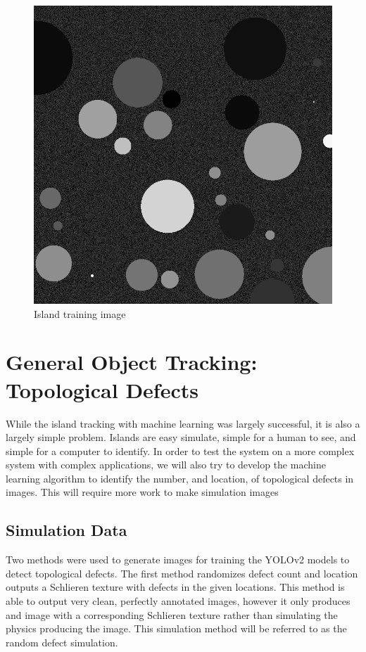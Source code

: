 \documentclass[prl,reprint,showpacs,floatfix,nofootinbib]{revtex4-1}
\begin{document}
\begin{figure}
  \includegraphics[width=\linewidth*3/4]{island_0024.png}
  \caption{Island training image}
  \label{fig:Islands}
\end{figure}

\section{General Object Tracking: Topological Defects}

While the island tracking with machine learning was largely successful, it is also a largely simple problem. Islands are easy simulate, simple for a human to see, and simple for a computer to identify. In order to test the system on a more complex system with complex applications, we will also try to develop the machine learning algorithm to identify the number, and location, of topological defects in images. This will require more work to make simulation images 

\subsection{Simulation Data}

Two methods were used to generate images for training the YOLOv2 models to detect topological defects. The first method randomizes defect count and location outputs a Schlieren texture with defects in the given locations. This method is able to output very clean, perfectly annotated images, however it only produces and image with a corresponding Schlieren texture rather than simulating the physics producing the image. This simulation method will be referred to as the random defect simulation.
\end{document}
